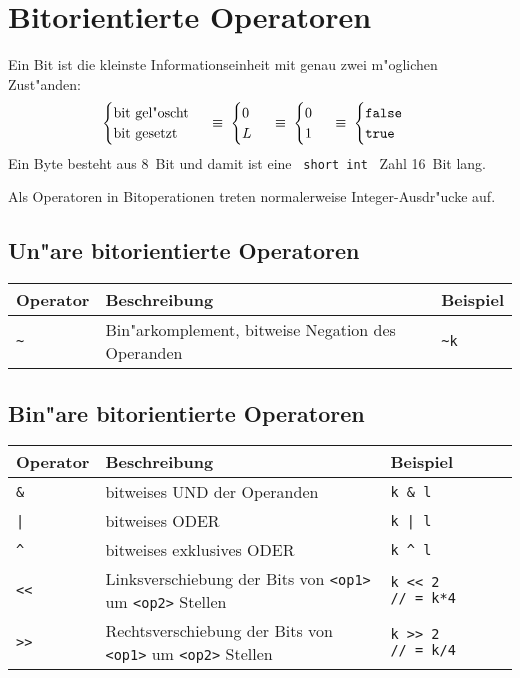\section{Bitorientierte Operatoren}
\label{p:3.5}
%
Ein Bit ist die kleinste Informationseinheit mit genau
zwei m"oglichen Zust"anden:
$$
\begin{cases} \text{bit gel"oscht} \\ \text{bit gesetzt} \end{cases}
\;\equiv\;
\begin{cases} 0 \\ L \end{cases}
\;\equiv\;
\begin{cases} 0 \\ 1 \end{cases}
\;\equiv\;
\begin{cases} \texttt{false} \\ \texttt{true} \end{cases}
\index{false}\index{true}
$$
Ein Byte besteht aus 8~Bit und damit ist eine \verb| short int | Zahl
16~Bit lang.

Als Operatoren in Bitoperationen treten normalerweise Integer-Ausdr"ucke auf.
%
\subsection{Un"are bitorientierte Operatoren}
\label{p:3.5.1}
%
\begin{tabular} {l@{\quad}p{}@{\quad}l}
 Operator & Beschreibung & Beispiel \\ \hline
 \verb|~|	& Bin"arkomplement, bitweise Negation des Operanden
 		& \verb|~k|
\end{tabular}
%
%
%
\subsection{Bin"are bitorientierte Operatoren}
\label{p:3.5.2}
%
\begin{tabular} {l@{\quad}p{}@{\quad}l}
 Operator & Beschreibung & Beispiel \\ \hline
 \verb|&| & bitweises UND  der Operanden & \verb|k & l|  \\
 \verb!|! & bitweises ODER & \verb!k | l! \\
 \verb|^| & bitweises exklusives ODER & \verb|k ^ l| \\
 \verb|<<| & Linksverschiebung der Bits von \texttt{<op1>}
 	um \texttt{<op2>} Stellen & \verb|k << 2      // = k*4| \\
 \verb|>>| & Rechtsverschiebung der Bits von \texttt{<op1>}
 	um \texttt{<op2>} Stellen & \verb|k >> 2      // = k/4|
\end{tabular}

